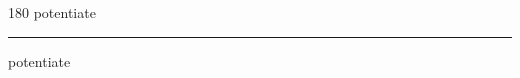 
\begin{frame}
\begin{center}
\begin{turn}{180}
{\fontsize{2.5cm}{1em}\selectfont potentiate}
\end{turn}
\vspace{1em}\par  
\hrule
\vspace{1em}\par  
{\fontsize{2.5cm}{1em}\selectfont potentiate}
\end{center}
\end{frame}
